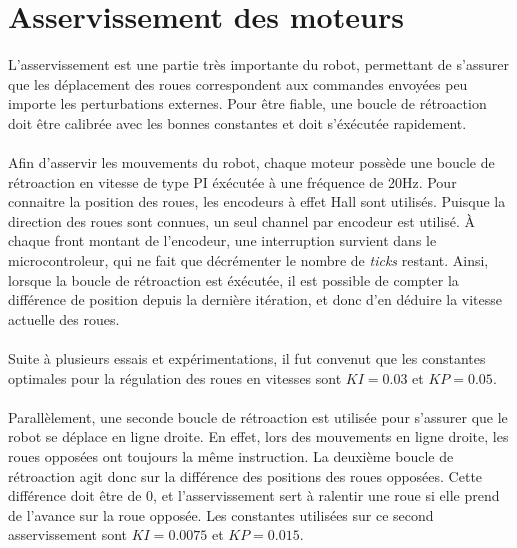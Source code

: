 \section{Asservissement des moteurs}

L'asservissement est une partie très importante du robot, permettant de s'assurer que les déplacement des roues correspondent aux commandes envoyées peu importe les perturbations externes. Pour être fiable, une boucle de rétroaction doit être calibrée avec les bonnes constantes et doit s'éxécutée rapidement.
\paragraph{}
Afin d'asservir les mouvements du robot, chaque moteur possède une boucle de rétroaction en vitesse de type PI éxécutée à une fréquence de 20Hz. Pour connaitre la position des roues, les encodeurs à effet Hall sont utilisés. Puisque la direction des roues sont connues, un seul channel par encodeur est utilisé. À chaque front montant de l'encodeur, une interruption survient dans le microcontroleur, qui ne fait que décrémenter le nombre de \textit{ticks} restant. Ainsi, lorsque la boucle de rétroaction est éxécutée, il est possible de compter la différence de position depuis la dernière itération, et donc d'en déduire la vitesse actuelle des roues. 
\paragraph{}
Suite à plusieurs essais et expérimentations, il fut convenut que les constantes optimales pour la régulation des roues en vitesses sont $KI = 0.03$ et $KP = 0.05$. 
\paragraph{}
Parallèlement, une seconde boucle de rétroaction est utilisée pour s'assurer que le robot se déplace en ligne droite. En effet, lors des mouvements en ligne droite, les roues opposées ont toujours la même instruction. La deuxième boucle de rétroaction agit donc sur la différence des positions des roues opposées. Cette différence doit être de 0, et l'asservissement sert à ralentir une roue si elle prend de l'avance sur la roue opposée. Les constantes utilisées sur ce second asservissement sont $KI = 0.0075$ et $KP = 0.015$.